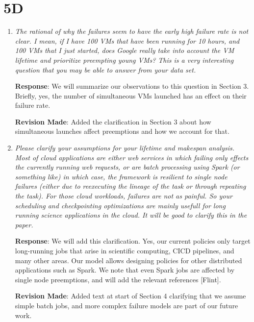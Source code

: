 \documentclass{article}
\newcommand{\resp}[1]{\textbf{Response}: #1}
\newcommand{\revmade}[1]{\textbf{Revision Made}: #1}
\begin{document}
\section{5D}

\begin{enumerate}

\item \emph{The rational of why the failures seem to have the early high failure rate is not clear. I mean, if I have 100 VMs that have been running for 10 hours, and 100 VMs that I just started, does Google really take into account the VM lifetime and prioritize preempting young VMs? This is a very interesting question that you may be able to answer from your data set.}

\resp{We will summarize our observations to this question in Section 3. Briefly, yes, the number of simultaneous VMs launched has an effect on their failure rate.}


\revmade{Added the clarification in Section 3 about how simultaneous launches affect preemptions and how we account for that.}


\item \emph{Please clarify your assumptions for your lifetime and makespan analysis. Most of cloud applications are either web services in which failing only effects the currently running web requests, or are batch processing using Spark (or something like) in which case, the framework is resilient to single node failures (either due to reexecuting the lineage of the task or through repeating the task). For those cloud workloads, failures are not as painful. So your scheduling and checkpointing optimizations are mainly usefull for long running science applications in the cloud. It will be good to clarify this in the paper.}

\resp{We will add this clarification. Yes, our current policies only target long-running jobs that arise in scientific computing, CICD pipelines, and many other areas. Our model allows designing policies for other distributed applications such as Spark. We note that even Spark jobs are affected by single node preemptions, and will add the relevant references [Flint]}.


\revmade{Added text at start of Section 4 clarifying that we assume simple batch jobs, and more complex failure models are part of our future work.} 


\end{enumerate}
\end{document}
